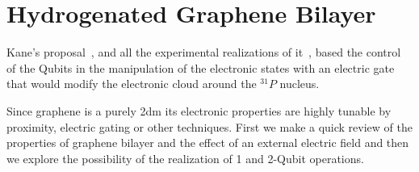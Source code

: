 \chapter{Hydrogenated Graphene Bilayer} %
Kane's proposal~\cite{Kane1988}, and all the experimental realizations of it~\cite{Morello2010}, based the control of the Qubits in the manipulation of the electronic states with an electric gate that would modify the electronic cloud around the $^{31}P$ nucleus.

Since graphene is a purely \ac{2dm} its electronic properties are highly tunable by proximity, electric gating or other techniques. First we make a quick review of the properties of graphene bilayer and the effect of an external electric field and then we explore the possibility of the realization of 1 and 2-Qubit operations.

